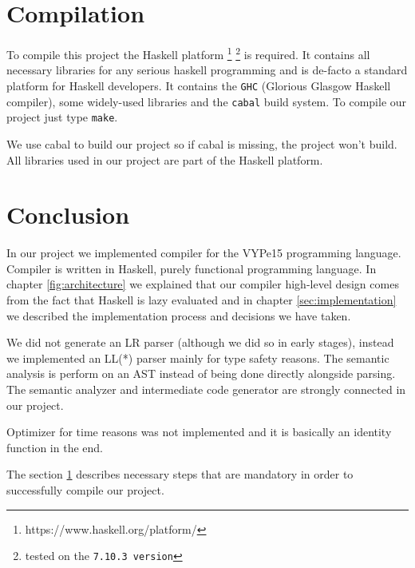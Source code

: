 \documentclass[titlepage]{article}
\begin{document}
\section{Compilation}
\label{sec:compilation}
To compile this project the Haskell platform \footnote{https://www.haskell.org/platform/} 
\footnote{tested on the \texttt{7.10.3 version}}
is required. It contains all necessary libraries for any serious haskell programming
and is de-facto a standard platform for Haskell developers. It contains the \texttt{GHC} 
(Glorious Glasgow
Haskell compiler), some widely-used libraries and the \texttt{cabal} build system.
To compile our project just type \texttt{make}.

We use cabal to build our project so if cabal is missing, the project won't build. 
All libraries used in our project are part of the Haskell platform.

\section{Conclusion}
In our project we implemented compiler for the VYPe15 programming language. Compiler
is written in Haskell, purely functional programming language. In chapter 
\ref{fig:architecture} we explained that our compiler high-level design comes from the 
fact
that Haskell is lazy evaluated and in chapter \ref{sec:implementation} we described the 
implementation process and decisions we have taken.

We did not generate an LR parser (although we did so in early stages), instead we
implemented an LL(*) parser mainly for type safety reasons. The semantic analysis is 
perform on an AST instead of being done directly alongside parsing. The semantic analyzer
and intermediate code generator are strongly connected in our project. 

Optimizer for time reasons was not implemented and it is basically an identity
function in the end. 

The section \ref{sec:compilation} describes necessary steps that are mandatory in order
to successfully compile our project.

\newpage


\end{document}
